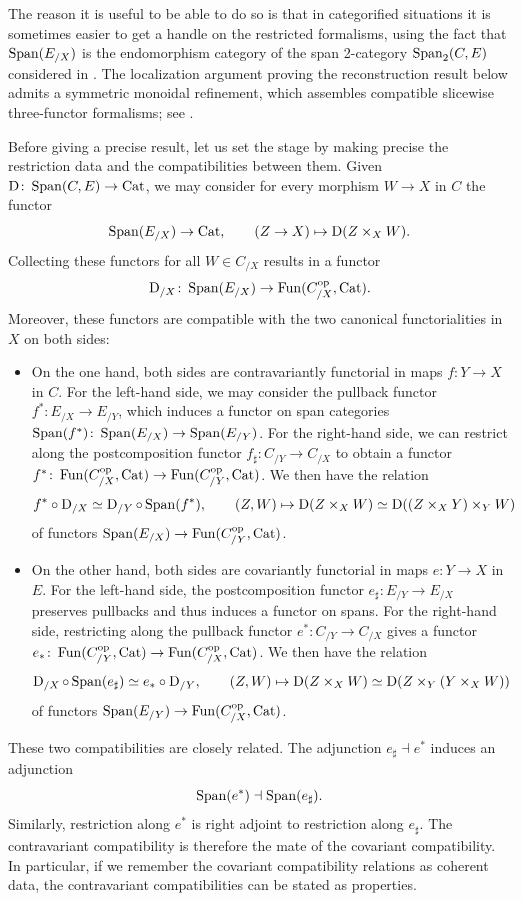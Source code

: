 \documentclass[11pt]{book}
\begin{document}
	The reason it is useful to be able to do so is that in categorified situations it is sometimes easier to get a handle on the restricted formalisms, using the fact that $\operatorname{Span}(E_{/X})$ is the endomorphism category of the span 2-category $\operatorname{Span}_2(C,E)$ considered in . The localization argument proving the reconstruction result below admits a symmetric monoidal refinement, which assembles compatible slicewise three-functor formalisms; see .

	Before giving a precise result, let us set the stage by making precise the restriction data and the compatibilities between them. Given $\operatorname{\mathrm{D}}\colon \operatorname{Span}(C,E) \to {\textup{Cat}}$, we may consider for every morphism $W \to X$ in $C$ the functor
	\[
		\operatorname{Span}(E_{/X}) \to {\textup{Cat}}, \qquad (Z \to X) \mapsto \operatorname{\mathrm{D}}(Z \times_X W).
	\]
	Collecting these functors for all $W \in C_{/X}$ results in a functor
	\[
		\operatorname{\mathrm{D}}_{/X}\colon \operatorname{Span}(E_{/X}) \to \operatorname{Fun}(C_{/X}^{\textup{op}},{\textup{Cat}}).
	\]
	Moreover, these functors are compatible with the two canonical functorialities in $X$ on both sides:
	\begin{itemize}
		\item On the one hand, both sides are contravariantly functorial in maps $f\colon Y \to X$ in $C$. For the left-hand side, we may consider the pullback functor $f^*\colon E_{/X} \to E_{/Y}$, which induces a functor on span categories $\operatorname{Span}(f^*)\colon \operatorname{Span}(E_{/X}) \to \operatorname{Span}(E_{/Y})$. For the right-hand side, we can restrict along the postcomposition functor $f_{\sharp}\colon C_{/Y} \to C_{/X}$ to obtain a functor $f^*\colon\operatorname{Fun}(C_{/X}^{\textup{op}},{\textup{Cat}})\to\operatorname{Fun}(C_{/Y}^{\textup{op}},{\textup{Cat}})$. We then have the relation
		\[
			f^* \circ \operatorname{\mathrm{D}}_{/X}\simeq \operatorname{\mathrm{D}}_{/Y}\circ\operatorname{Span}(f^*), \qquad (Z,W)\mapsto \operatorname{\mathrm{D}}(Z \times_X W) \simeq \operatorname{\mathrm{D}}((Z \times_X Y) \times_Y W)
		\]
		of functors $\operatorname{Span}(E_{/X})\to\operatorname{Fun}(C_{/Y}^{\textup{op}},{\textup{Cat}})$.
		\item On the other hand, both sides are covariantly functorial in maps $e\colon Y \to X$ in $E$. For the left-hand side, the postcomposition functor $e_{\sharp}\colon E_{/Y} \to E_{/X}$ preserves pullbacks and thus induces a functor on spans. For the right-hand side, restricting along the pullback functor $e^*\colon C_{/Y} \to C_{/X}$ gives a functor $e_*\colon \operatorname{Fun}(C_{/Y}^{\textup{op}},{\textup{Cat}})\to\operatorname{Fun}(C_{/X}^{\textup{op}},{\textup{Cat}})$. We then have the relation
		\[
			\operatorname{\mathrm{D}}_{/X} \circ \operatorname{Span}(e_{\sharp}) \simeq e_*\circ \operatorname{\mathrm{D}}_{/Y}, \qquad (Z,W) \mapsto \operatorname{\mathrm{D}}(Z \times_X W) \simeq \operatorname{\mathrm{D}}(Z \times_Y (Y \times_X W))
		\]
		of functors $\operatorname{Span}(E_{/Y}) \to \operatorname{Fun}(C_{/X}^{\textup{op}},{\textup{Cat}})$.
	\end{itemize}
	These two compatibilities are closely related. The adjunction $e_{\sharp}\dashv e^*$ induces an adjunction
	\[
		\operatorname{Span}(e^*)\dashv \operatorname{Span}(e_{\sharp}).
	\]
	Similarly, restriction along $e^*$ is right adjoint to restriction along $e_{\sharp}$. The contravariant compatibility is therefore the mate of the covariant compatibility. In particular, if we remember the covariant compatibility relations as coherent data, the contravariant compatibilities can be stated as properties.
\end{document}
